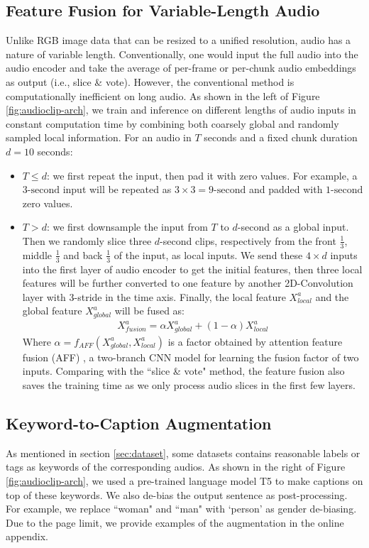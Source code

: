 \subsection{Feature Fusion for Variable-Length Audio}
Unlike RGB image data that can be resized to a unified resolution, audio has a nature of variable length. 
Conventionally, one would input the full audio into the audio encoder and take the average of per-frame or per-chunk audio embeddings as output (i.e., slice \& vote). However, the conventional method is computationally inefficient on long audio.
As shown in the left of Figure \ref{fig:audioclip-arch}, we train and inference on different lengths of audio inputs in constant computation time by combining both coarsely global and randomly sampled local information. For an audio in $T$ seconds and a fixed chunk duration $d=10$ seconds:
\begin{itemize}[leftmargin=*]
    \item $T \leq d$: we first repeat the input, then pad it with zero values. For example,  a $\text{3-second}$ input will be repeated as $3\times3=\text{9-second}$ and padded with $\text{1-second}$ zero values.
    \item $T > d$: we first downsample the input from $T$ to $d$-second as a global input. Then we randomly slice three $d$-second clips, respectively from the front $\frac{1}{3}$, middle $\frac{1}{3}$ and back $\frac{1}{3}$ of the input, as local inputs. We send these $4 \times d$ inputs into the first layer of audio encoder to get the initial features, then three local features will be further converted to one feature by another 2D-Convolution layer with 3-stride in the time axis. Finally, the local feature $X^a_{local}$ and the global feature $X^a_{global}$ will be fused as:
    \begin{align}
        X^a_{fusion}= \alpha X^a_{global}+(1-\alpha)X^a_{local}
    \end{align}
    Where $\alpha=f_{AFF}(X^a_{global},X^a_{local})$ is a factor obtained by attention feature fusion (AFF) \cite{aff}, a two-branch CNN model for learning the fusion factor of two inputs. Comparing with the ``slice \& vote" method, the feature fusion also saves the training time as we only process audio slices in the first few layers. 
\end{itemize}
\vspace{-0.4cm}
\subsection{Keyword-to-Caption Augmentation} \label{sec:ksa}
As mentioned in section \ref{sec:dataset}, some datasets contains reasonable labels or tags as keywords of the corresponding audios. As shown in the right of Figure \ref{fig:audioclip-arch}, we used a pre-trained language model T5 \cite{t5model} to make captions on top of these keywords. We also de-bias the output sentence as post-processing. For example, we replace ``woman" and ``man" with `person' as gender de-biasing. Due to the page limit, we provide examples of the augmentation in the online appendix. 


